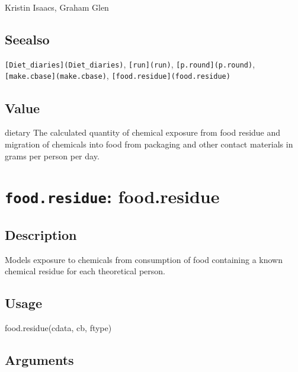 \documentclass[
]{article}
\newenvironment{Shaded}{\begin{snugshade}}{\end{snugshade}}
\newcommand{\FunctionTok}[1]{\textcolor[rgb]{0.00,0.00,0.00}{#1}}
\newcommand{\NormalTok}[1]{#1}
\begin{document}
Kristin Isaacs, Graham Glen

\hypertarget{seealso-12}{%
\subsection{Seealso}\label{seealso-12}}

\texttt{{[}Diet\_diaries{]}(Diet\_diaries)}, \texttt{{[}run{]}(run)},
\texttt{{[}p.round{]}(p.round)}, \texttt{{[}make.cbase{]}(make.cbase)},
\texttt{{[}food.residue{]}(food.residue)}

\hypertarget{value-17}{%
\subsection{Value}\label{value-17}}

dietary The calculated quantity of chemical exposure from food residue
and migration of chemicals into food from packaging and other contact
materials in grams per person per day.

\hypertarget{food.residue-food.residue}{%
\section{\texorpdfstring{\texttt{food.residue}:
food.residue}{food.residue: food.residue}}\label{food.residue-food.residue}}

\hypertarget{description-23}{%
\subsection{Description}\label{description-23}}

Models exposure to chemicals from consumption of food containing a known
chemical residue for each theoretical person.

\hypertarget{usage-23}{%
\subsection{Usage}\label{usage-23}}

\begin{Shaded}
\begin{Highlighting}[]
\FunctionTok{food.residue}\NormalTok{(cdata, cb, ftype)}
\end{Highlighting}
\end{Shaded}

\hypertarget{arguments-20}{%
\subsection{Arguments}\label{arguments-20}}
\end{document}
